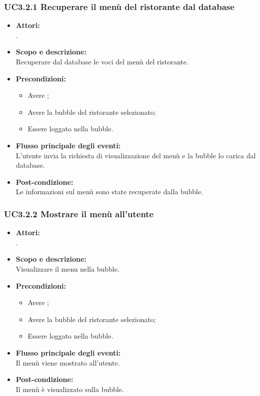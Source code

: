 \subsubsection{UC3.2.1 Recuperare il menù del ristorante dal database} \label{UC3.2.1}

\begin{itemize}
	\item \textbf{Attori:}
	\\.
	\item \textbf{Scopo e descrizione:} 
	\\Recuperare dal database le voci del menù del ristorante.
	\item \textbf{Precondizioni:}
	\begin{itemize}
		\item Avere ;
		\item Avere la bubble del ristorante selezionato;
		\item Essere loggato nella bubble.
	\end{itemize}
	\item \textbf{Flusso principale degli eventi:}
	\\L’utente invia la richiesta di visualizzazione del menù e la bubble lo carica dal database.
	\item \textbf{Post-condizione:}
	\\Le informazioni sul menù sono state recuperate dalla bubble.
\end{itemize}

\subsubsection{UC3.2.2 Mostrare il menù all’utente} \label{UC3.2.2}

\begin{itemize}
	\item \textbf{Attori:}
	\\.
	\item \textbf{Scopo e descrizione:} 
	\\Visualizzare il menu nella bubble.
	\item \textbf{Precondizioni:}
	\begin{itemize}
		\item Avere ;
		\item Avere la bubble del ristorante selezionato;
		\item Essere loggato nella bubble.
	\end{itemize}
	\item \textbf{Flusso principale degli eventi:}
	\\Il menù viene mostrato all’utente.
	\item \textbf{Post-condizione:}
	\\Il menù è visualizzato sulla bubble.
\end{itemize}

